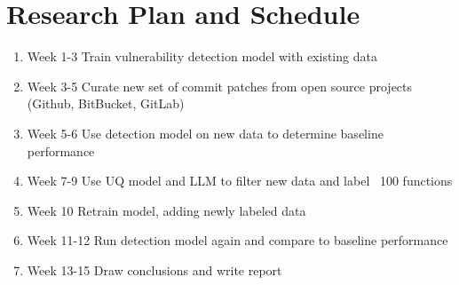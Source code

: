 \section{Research Plan and Schedule}
\done{}

\begin{enumerate}
    \item Week 1-3 Train vulnerability detection model with existing data

    \item Week 3-5 Curate new set of commit patches from open source projects (Github, BitBucket, GitLab)

    \item Week 5-6 Use detection model on new data to determine baseline performance

    \item Week 7-9 Use UQ model and LLM to filter new data and label ~100 functions

    \item Week 10 Retrain model, adding newly labeled data 

    \item Week 11-12 Run detection model again and compare to baseline performance

    \item Week 13-15 Draw conclusions and write report

\end{enumerate}
